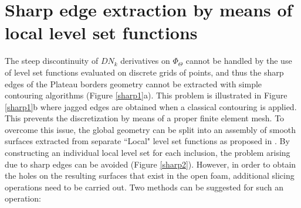 \section{Sharp edge extraction by means of local level set functions}\label{of-sharp}
The steep discontinuity of $ DN_k $ derivatives on $ \Phi_\Theta $ cannot be handled by the use of level set functions evaluated on discrete grids of points, and thus the sharp edges of the Plateau borders geometry cannot be extracted with simple contouring algorithms (Figure \ref{sharp1}a). This problem is illustrated in Figure \ref{sharp1}b where jagged edges are obtained when a classical contouring is applied. This prevents the discretization by means of a proper finite element mesh. To overcome this issue, the global geometry can be split into an assembly of smooth surfaces extracted from separate ``Local" level set functions as proposed in \cite{sononAdvancedApproachGeneration2015}. 
By constructing an individual local level set for each inclusion, the problem arising due to sharp edges can be avoided (Figure \ref{sharp2}). However, in order to obtain the holes on the resulting surfaces that exist in the open foam, additional slicing operations need to be carried out. Two methods can be suggested for such an operation:
